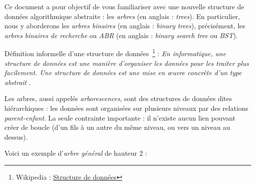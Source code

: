 \documentclass[11pt,a4paper]{article}
\begin{document}
\EncadreTitre

\bigskip


%
%

\bigskip


Ce document a pour objectif de vous familiariser avec une nouvelle structure de données algorithmique abstraite : les \textit{arbres} (en anglais : \textit{trees}).
En particulier, nous y aborderons les \textit{arbres binaires} (en anglais : \textit{binary trees}), précisément, les \textit{arbres binaires de recherche} ou \textit{ABR} (en anglais : \textit{binary search tree} ou \textit{BST}).

\bigskip

Définition informelle d'une structure de données~\footnote{Wikipedia : \href{https://fr.wikipedia.org/wiki/Structure_de_donn\%C3\%A9es}{Structure de données}} : \og \textit{En informatique, une structure de données est une manière d'organiser les données pour les traiter plus facilement. Une structure de données est une mise en œuvre concrète d'un type abstrait} \fg .

\bigskip

Les arbres, aussi appelés \textit{arborescences}, sont des structures de données dites hiérarchiques : les données sont organisées sur plusieurs niveaux par des relations \textit{parent-enfant}.
La seule contrainte importante : il n'existe aucun lien pouvant créer de boucle (d'un fils à un autre du même niveau, ou vers un niveau au dessus).

Voici un exemple d'\textit{arbre général} de hauteur 2 :

\medskip
\end{document}
